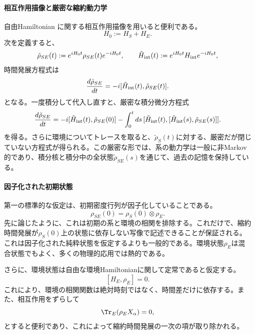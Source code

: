 \documentclass[a4paper,11pt,oneside]{article}
\theoremstyle{definition}
\numberwithin{equation}{section}
\begin{document}
\paragraph{相互作用描像と厳密な縮約動力学}



自由Hamiltonian
に関する相互作用描像を用いると便利である。
\begin{equation}
H_0 := H_S + H_E .
\end{equation}
次を定義すると、
\begin{equation}
\tilde \rho_{SE}(t) := e^{iH_0 t}\rho_{SE}(t)e^{-iH_0 t} ,
\qquad
\tilde H_{\rm int}(t) := e^{iH_0 t}H_{\rm int}e^{-iH_0 t} ,
\end{equation}
時間発展方程式は
\begin{equation}\label{intpicexact}
\frac{d\tilde \rho_{SE}}{dt} = -i[\tilde H_{\rm int}(t),\tilde \rho_{SE}(t)] .
\end{equation}
となる。一度積分して代入し直すと、厳密な積分微分方程式
\begin{equation}\label{born-exact-pre}
\frac{d\tilde \rho_{SE}}{dt}
=
-i[\tilde H_{\rm int}(t),\tilde \rho_{SE}(0)]
-
\int_0^t ds\,
[\tilde H_{\rm int}(t),[\tilde H_{\rm int}(s),\tilde \rho_{SE}(s)]] .
\end{equation}
を得る。さらに環境についてトレースを取ると、$\tilde \rho_S(t)$に対する、厳密だが閉じていない方程式が得られる。この厳密な形では、系の動力学は一般に非Markov的であり、積分核と積分中の全状態$\tilde \rho_{SE}(s)$を通じて、過去の記憶を保持している。



\paragraph{因子化された初期状態}



第一の標準的な仮定は、初期密度行列が因子化していることである。
\begin{equation}\label{microfactorized}
\rho_{SE}(0)=\rho_S(0)\otimes \rho_E .
\end{equation}
先に論じたように、これは初期の系と環境の相関を排除する。これだけで、縮約時間発展が$\rho_S(0)$上の状態に依存しない写像で記述できることが保証される。これは因子化された純粋状態を仮定するよりも一般的である。環境状態$\rho_E$は混合状態でもよく、多くの物理的応用では熱的である。



さらに、環境状態は自由な環境Hamiltonianに関して定常であると仮定する。
\begin{equation}\label{rhostationary}
[H_E,\rho_E]=0 .
\end{equation}
これにより、環境の相関関数は絶対時刻ではなく、時間差だけに依存する。また、相互作用をずらして
\begin{equation}
\Tr_E(\rho_E X_\alpha)=0 ,
\end{equation}
とすると便利であり、これによって縮約時間発展の一次の項が取り除かれる。
\end{document}
